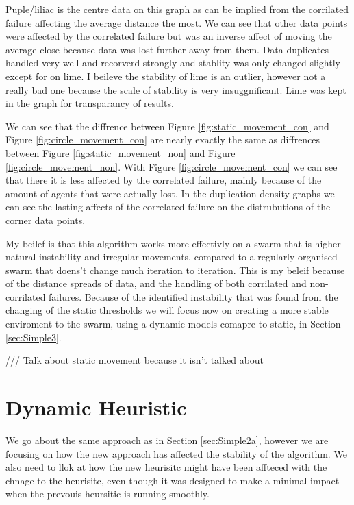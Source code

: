 \documentclass{UoYCSproject}
\begin{document}
Puple/liliac is the centre data on this graph as can be implied from the corrilated failure affecting the average distance the most.
We can see that other data points were affected by the correlated failure but was an inverse affect of moving the average close because data was lost further away from them.
Data duplicates handled very well and recorverd strongly and stablity was only changed slightly except for on lime.
I beileve the stability of lime is an outlier, however not a really bad one because the scale of stability is very insuggnificant.
Lime was kept in the graph for transparancy of results.

We can see that the diffrence between Figure \ref{fig:static_movement_con} and Figure \ref{fig:circle_movement_con} are nearly exactly the same as diffrences between Figure \ref{fig:static_movement_non} and Figure \ref{fig:circle_movement_non}.
With Figure \ref{fig:circle_movement_con} we can see that there it is less affected by the correlated failure, mainly because of the amount of agents that were actually lost.
In the duplication density graphs we can see the lasting affects of the correlated failure on the distrubutions of the corner data points.

My beilef is that this algorithm works more effectivly on a swarm that is higher natural instability and irregular movements, compared to a regularly organised swarm that doens't change much iteration to iteration.
This is my beleif because of the distance spreads of data, and the handling of both corrilated and non-corrilated failures.
Because of the identified instability that was found from the changing of the static thresholds we will focus now on creating a more stable enviroment to the swarm, using a dynamic models comapre to static, in Section \ref{sec:Simple3}.


/// Talk about static movement because it isn't talked about

\section{Dynamic Heuristic}
\label{sec:Simple3a}

We go about the same approach as in Section \ref{sec:Simple2a}, however we are focusing on how the new approach has affected the stability of the algorithm.
We also need to llok at how the new heurisitc might have been affteced with the chnage to the heurisitc, even though it was designed to make a minimal impact when the prevouis heursitic is running smoothly.
\end{document}
